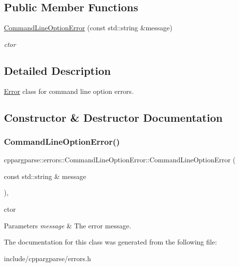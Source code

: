 \subsection*{Public Member Functions}
\begin{DoxyCompactItemize}
\item 
\hyperlink{classcppargparse_1_1errors_1_1CommandLineOptionError_a587934b01bd577262174bd82af79b75c}{Command\+Line\+Option\+Error} (const std\+::string \&message)
\begin{DoxyCompactList}\small\item\em c\textquotesingle{}tor \end{DoxyCompactList}\end{DoxyCompactItemize}


\subsection{Detailed Description}
\hyperlink{classcppargparse_1_1errors_1_1Error}{Error} class for command line option errors. 

\subsection{Constructor \& Destructor Documentation}
\mbox{\label{classcppargparse_1_1errors_1_1CommandLineOptionError_a587934b01bd577262174bd82af79b75c}} 
\subsubsection{\texorpdfstring{Command\+Line\+Option\+Error()}{CommandLineOptionError()}}
{\footnotesize\ttfamily cppargparse\+::errors\+::\+Command\+Line\+Option\+Error\+::\+Command\+Line\+Option\+Error (\begin{DoxyParamCaption}\item[{const std\+::string \&}]{message }\end{DoxyParamCaption})\hspace{0.3cm}{\ttfamily [inline]}, {\ttfamily [explicit]}}



c\textquotesingle{}tor 


\begin{DoxyParams}{Parameters}
{\em message} & The error message. \\
\hline
\end{DoxyParams}


The documentation for this class was generated from the following file\+:\begin{DoxyCompactItemize}
\item 
include/cppargparse/errors.\+h\end{DoxyCompactItemize}
